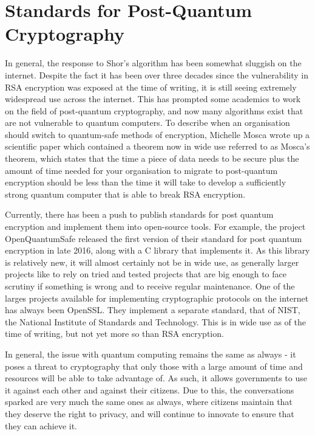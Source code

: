 \documentclass[a4paper,12pt]{report}
\begin{document}
  \section{Standards for Post-Quantum Cryptography}
In general, the response to Shor's algorithm has been somewhat sluggish on the
internet. Despite the fact it has been over three decades since the vulnerability
in RSA encryption was exposed at the time of writing, it is still seeing
extremely widespread use across the internet. This has prompted some academics
to work on the field of post-quantum cryptography, and now many algorithms exist
that are not vulnerable to quantum computers. To describe when an organisation
should switch to quantum-safe methods of encryption, Michelle Mosca wrote up a
scientific paper which contained a theorem now in wide use referred to as
Mosca's theorem, which states that the time a piece of data needs to be secure
plus the amount of time needed for your organisation to migrate to post-quantum
encryption should be less than the time it will take to develop a sufficiently
strong quantum computer that is able to break RSA encryption\cite{mosca}.

Currently, there has been a push to publish standards for post quantum
encryption and implement them into open-source tools. For example, the project
OpenQuantumSafe released the first version of their standard for post quantum
encryption in late 2016\cite{openquantumsafe}, along with a C library that
implements it. As this library is relatively new, it will almost certainly not
be in wide use, as generally larger projects like to rely on tried and tested
projects that are big enough to face scrutiny if something is wrong and to
receive regular maintenance. One of the larges projects available for
implementing cryptographic protocols on the internet has always been OpenSSL.
They implement a separate standard, that of NIST\cite{nist}, the National
Institute of Standards and Technology. This is in wide use as of the time of
writing, but not yet more so than RSA encryption.

In general, the issue with quantum computing remains the same as always - it
poses a threat to cryptography that only those with a large amount of time and
resources will be able to take advantage of. As such, it allows governments to
use it against each other and against their citizens. Due to this, the
conversations sparked are very much the same ones as always, where citizens
maintain that they deserve the right to privacy, and will continue to innovate
to ensure that they can achieve it.
\end{document}

